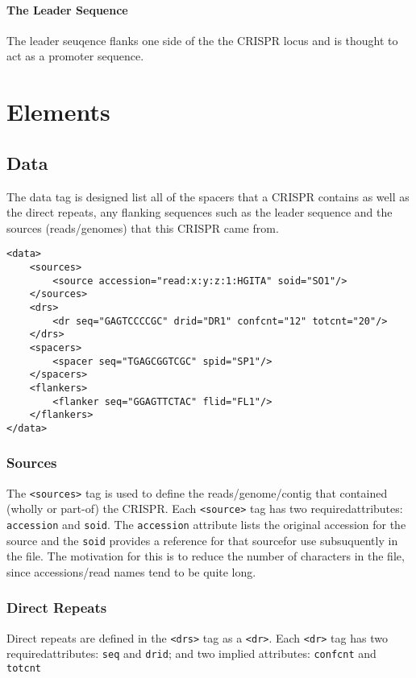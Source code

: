\documentclass[11pt]{article} %
\begin{document}
\paragraph{The Leader Sequence}
The leader seuqence flanks one side of the the CRISPR locus and is thought to act as a promoter sequence.
\section{Elements}
\subsection{Data}
The data tag is designed list all of the spacers that a CRISPR contains as well as the direct repeats, any flanking sequences such as the leader sequence and the sources (reads/genomes) that this CRISPR came from.

\begin{lstlisting}[language=XML_new]
<data>
	<sources>
		<source accession="read:x:y:z:1:HGITA" soid="SO1"/>
	</sources>
	<drs>
		<dr seq="GAGTCCCCGC" drid="DR1" confcnt="12" totcnt="20"/>
	</drs>
	<spacers>
		<spacer seq="TGAGCGGTCGC" spid="SP1"/>
	</spacers>
	<flankers>
		<flanker seq="GGAGTTCTAC" flid="FL1"/>
	</flankers>
</data>
\end{lstlisting}
\subsubsection{Sources}
The \lstinline[language=XML_new]$<sources>$ tag is used to define the reads/genome/contig that contained (wholly or part-of) the CRISPR.
 Each \lstinline[language=XML_new]$<source>$  tag has two requiredattributes: \lstinline[language=XML_new]$accession$ and \lstinline[language=XML_new]$soid$.
The \lstinline[language=XML_new]$accession$ attribute lists the original accession for the source and the \lstinline[language=XML_new]$soid$ provides a reference for that sourcefor use subsuquently in the file.  The motivation for this is to reduce the number of characters in the file, since accessions/read names tend to be quite long.
\subsubsection{Direct Repeats}
Direct repeats are defined in the \lstinline[language=XML_new]$<drs>$  tag as a \lstinline[language=XML_new]$<dr>$.  Each \lstinline[language=XML_new]$<dr>$  tag has two requiredattributes: \lstinline[language=XML_new]$seq$ and \lstinline[language=XML_new]$drid$; and two implied attributes: \lstinline[language=XML_new]$confcnt$ and \lstinline[language=XML_new]$totcnt$
\end{document}
